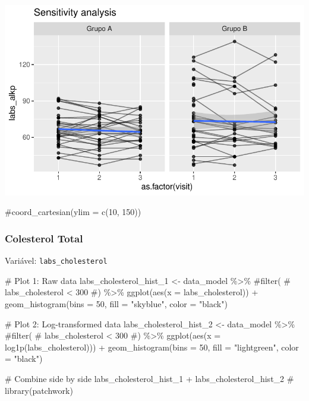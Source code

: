\documentclass[
  letterpaper,
  DIV=11,
  numbers=noendperiod]{scrartcl}
\newenvironment{Shaded}{\begin{snugshade}}{\end{snugshade}}
\newcommand{\AttributeTok}[1]{\textcolor[rgb]{0.40,0.45,0.13}{#1}}
\newcommand{\CommentTok}[1]{\textcolor[rgb]{0.37,0.37,0.37}{#1}}
\newcommand{\DecValTok}[1]{\textcolor[rgb]{0.68,0.00,0.00}{#1}}
\newcommand{\FunctionTok}[1]{\textcolor[rgb]{0.28,0.35,0.67}{#1}}
\newcommand{\NormalTok}[1]{\textcolor[rgb]{0.00,0.23,0.31}{#1}}
\newcommand{\OtherTok}[1]{\textcolor[rgb]{0.00,0.23,0.31}{#1}}
\newcommand{\SpecialCharTok}[1]{\textcolor[rgb]{0.37,0.37,0.37}{#1}}
\newcommand{\StringTok}[1]{\textcolor[rgb]{0.13,0.47,0.30}{#1}}
\begin{document}
\includegraphics{Outcomes_V1V2V3_files/figure-pdf/labs_alkp_6-2.pdf}

\begin{Shaded}
\begin{Highlighting}[]
    \CommentTok{\#coord\_cartesian(ylim = c(10, 150))}
\end{Highlighting}
\end{Shaded}

\subsubsection{Colesterol Total}\label{colesterol-total}

Variável: \texttt{labs\_cholesterol}

\begin{Shaded}
\begin{Highlighting}[]
\CommentTok{\# Plot 1: Raw data}
\NormalTok{labs\_cholesterol\_hist\_1 }\OtherTok{\textless{}{-}}\NormalTok{ data\_model }\SpecialCharTok{\%\textgreater{}\%} 
    \CommentTok{\#filter(}
    \CommentTok{\#    labs\_cholesterol \textless{} 300}
    \CommentTok{\#) \%\textgreater{}\% }
    \FunctionTok{ggplot}\NormalTok{(}\FunctionTok{aes}\NormalTok{(}\AttributeTok{x =}\NormalTok{ labs\_cholesterol)) }\SpecialCharTok{+} 
    \FunctionTok{geom\_histogram}\NormalTok{(}\AttributeTok{bins =} \DecValTok{50}\NormalTok{, }\AttributeTok{fill =} \StringTok{"skyblue"}\NormalTok{, }\AttributeTok{color =} \StringTok{"black"}\NormalTok{)}

\CommentTok{\# Plot 2: Log{-}transformed data}
\NormalTok{labs\_cholesterol\_hist\_2 }\OtherTok{\textless{}{-}}\NormalTok{ data\_model }\SpecialCharTok{\%\textgreater{}\%} 
    \CommentTok{\#filter(}
    \CommentTok{\#    labs\_cholesterol \textless{} 300}
    \CommentTok{\#) \%\textgreater{}\%}
    \FunctionTok{ggplot}\NormalTok{(}\FunctionTok{aes}\NormalTok{(}\AttributeTok{x =} \FunctionTok{log1p}\NormalTok{(labs\_cholesterol))) }\SpecialCharTok{+} 
    \FunctionTok{geom\_histogram}\NormalTok{(}\AttributeTok{bins =} \DecValTok{50}\NormalTok{, }\AttributeTok{fill =} \StringTok{"lightgreen"}\NormalTok{, }\AttributeTok{color =} \StringTok{"black"}\NormalTok{)}

\CommentTok{\# Combine side by side}
\NormalTok{labs\_cholesterol\_hist\_1 }\SpecialCharTok{+}\NormalTok{ labs\_cholesterol\_hist\_2 }\CommentTok{\# library(patchwork)}
\end{Highlighting}
\end{Shaded}
\end{document}
